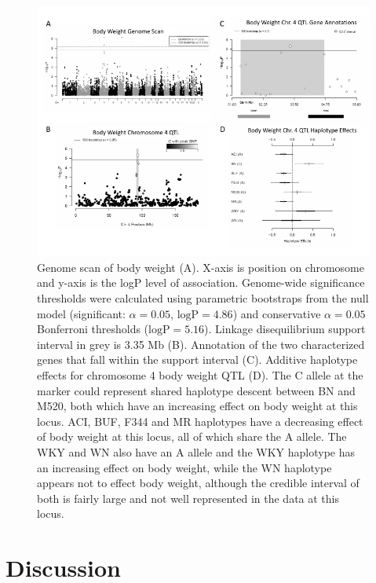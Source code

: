 \begin{figure}
\centering
\includegraphics[trim={0in 0in 0in 0in}, clip, width=\textwidth]{figures/5-hsrats/Figure7-alt.pdf}
\caption[Body weight chromosome 4 QTL and subsequent fine-mapping analyses]{Genome scan of body weight (A). X-axis is position on chromosome and y-axis is the logP level of association. Genome-wide significance thresholds were calculated using parametric bootstraps from the null model (significant: $\alpha=0.05$, $\text{logP} = 4.86$) and conservative $\alpha=0.05$ Bonferroni thresholds ($\text{logP} = 5.16$). Linkage disequilibrium support interval in grey is 3.35 Mb (B). Annotation of the two characterized genes that fall within the support interval (C). Additive haplotype effects for chromosome 4 body weight QTL (D).  The C allele at the marker could represent shared haplotype descent between BN and M520, both which have an increasing effect on body weight at this locus. ACI, BUF, F344 and MR haplotypes have a decreasing effect of body weight at this locus, all of which share the A allele.  The WKY and WN also have an A allele and the WKY haplotype has an increasing effect on body weight, while the WN haplotype appears not to effect body weight, although the credible interval of both is fairly large and not well represented in the data at this locus.\label{fig:bodyweight_chr4}}
\end{figure}

\section{Discussion}

